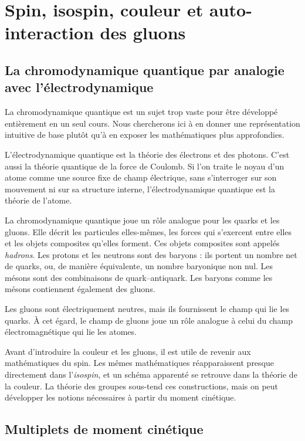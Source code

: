 \chapter{Spin, isospin, couleur et auto-interaction des gluons}

\section{La chromodynamique quantique par analogie avec l’électrodynamique}

La chromodynamique quantique est un sujet trop vaste pour être développé entièrement en un seul cours. Nous chercherons ici à en donner une représentation intuitive de base plutôt qu’à en exposer les mathématiques plus approfondies.

L’électrodynamique quantique est la théorie des électrons et des photons. C’est aussi la théorie quantique de la force de Coulomb. Si l’on traite le noyau d’un atome comme une source fixe de champ électrique, sans s’interroger sur son mouvement ni sur sa structure interne, l’électrodynamique quantique est la théorie de l’atome.

La chromodynamique quantique joue un rôle analogue pour les quarks et les gluons. Elle décrit les particules elles-mêmes, les forces qui s’exercent entre elles et les objets composites qu’elles forment. Ces objets composites sont appelés \emph{hadrons}. Les protons et les neutrons sont des baryons : ils portent un nombre net de quarks, ou, de manière équivalente, un nombre baryonique non nul. Les mésons sont des combinaisons de quark--antiquark. Les baryons comme les mésons contiennent également des gluons.

Les gluons sont électriquement neutres, mais ils fournissent le champ qui lie les quarks. À cet égard, le champ de gluons joue un rôle analogue à celui du champ électromagnétique qui lie les atomes.

Avant d’introduire la couleur et les gluons, il est utile de revenir aux mathématiques du spin. Les mêmes mathématiques réapparaissent presque directement dans l’\emph{isospin}, et un schéma apparenté se retrouve dans la théorie de la couleur. La théorie des groupes sous-tend ces constructions, mais on peut développer les notions nécessaires à partir du moment cinétique.

\section{Multiplets de moment cinétique}

